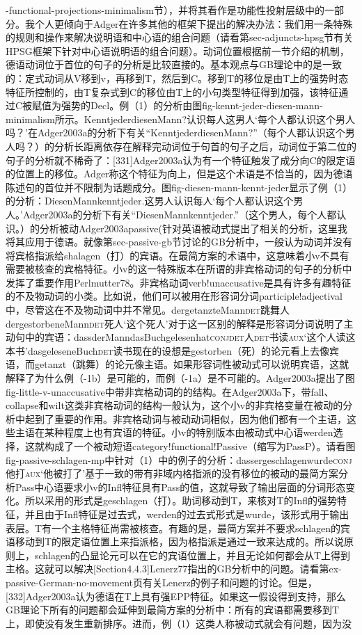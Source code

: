 -functional-projections-minimalism节），并将其看作是功能性投射层级中的一部分。我个人更倾向于Adger在许多其他的框架下提出的解决办法：我们用一条特殊的规则和操作来解决说明语和中心语的组合问题（请看第sec-adjuncts-hpsg节有关HPSG框架下针对中心语说明语的组合问题）。动词位置根据前一节介绍的机制，德语动词位于首位的句子的分析是比较直接的。基本观点与GB理论中的是一致的：定式动词从V移到v，再移到T，然后到C。移到T的移位是由T上的强势时态特征所控制的，由T复杂式到C的移位由T上的小句类型特征得到加强，该特征通过C被赋值为强势的Decl。例（1）的分析由图fig-kennt-jeder-diesen-mann-minimalism所示。KenntjederdiesenMann?认识每人这男人`每个人都认识这个男人吗？'在Adger2003a的分析下有关“KenntjederdiesenMann?”（每个人都认识这个男人吗？）的分析长距离依存在解释完动词位于句首的句子之后，动词位于第二位的句子的分析就不稀奇了：[331]Adger2003a认为有一个特征触发了成分向C的限定语的位置上的移位。Adger称这个特征为向上，但是这个术语是不恰当的，因为德语陈述句的首位并不限制为话题成分。图fig-diesen-mann-kennt-jeder显示了例（1）的分析：DiesenMannkenntjeder.这男人认识每人`每个人都认识这个男人。'Adger2003a的分析下有关“DiesenMannkenntjeder.”（这个男人，每个人都认识。）的分析被动Adger2003apassive(针对英语被动式提出了相关的分析，这里我将其应用于德语。就像第sec-passive-gb节讨论的GB分析中，一般认为动词并没有将宾格指派给shalagen（打）的宾语。在最简方案的术语中，这意味着小v不具有需要被核查的宾格特征。小v的这一特殊版本在所谓的非宾格动词的句子的分析中发挥了重要作用Perlmutter78。非宾格动词verb!unaccusative是具有许多有趣特征的不及物动词的小类。比如说，他们可以被用在形容词分词participle!adjectival中，尽管这在不及物动词中并不常见。dergetanzteMann\textsc{det}跳舞人dergestorbeneMann\textsc{det}死人`这个死人'对于这一区别的解释是形容词分词说明了主动句中的宾语：dassderManndasBuchgelesenhat\textsc{conj}\textsc{det}人\textsc{det}书读\textsc{aux}`这个人读这本书'dasgeleseneBuch\textsc{det}读书现在的设想是gestorben（死）的论元看上去像宾语，而getanzt（跳舞）的论元像主语。如果形容词性被动式可以说明宾语，这就解释了为什么例（-1b）是可能的，而例（-1a）是不可能的。Adger2003a提出了图fig-little-v-unaccusative中带非宾格动词的的结构。在Adger2003a下，带fall、collapse和wilt这类非宾格动词的结构一般认为，这个小v的非宾格变量在被动的分析中起到了重要的作用。非宾格动词与被动动词相似，因为他们都有一个主语，这些主语在某种程度上也有宾语的特征。小v的特别版本由被动式中心语werden选择，这就构成了一个被动短语category!functional!Passive（缩写为PassP）。请看图fig-passive-schlagen-mp中针对（1）中的例子的分析：dassergeschlagenwurde\textsc{conj}他打\textsc{aux}`他被打了'基于一致的带有非域内格指派的没有移位的被动的最简方案分析Pass中心语要求小v的Infl特征具有Pass的值，这就导致了输出层面的分词形态变化。所以采用的形式是geschlagen（打）。助词移动到T，来核对T的Infl的强势特征，并且由于Infl特征是过去式，werden的过去式形式是wurde，该形式用于输出表层。T有一个主格特征尚需被核查。有趣的是，最简方案并不要求schlagen的宾语移动到T的限定语位置上来指派格，因为格指派是通过一致来达成的。所以说原则上，schlagen的凸显论元可以在它的宾语位置上，并且无论如何都会从T上得到主格。这就可以解决[Section4.4.3]Lenerz77指出的GB分析中的问题。请看第ex-passive-German-no-movement页有关Lenerz的例子和问题的讨论。但是，[332]Adger2003a认为德语在T上具有强EPP特征。如果这一假设得到支持，那么GB理论下所有的问题都会延伸到最简方案的分析中：所有的宾语都需要移到T上，即使没有发生重新排序。进而，例（1）这类人称被动式就会有问题，因为没